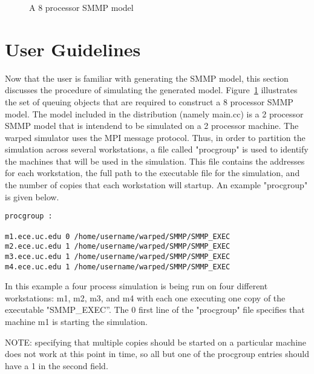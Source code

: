 \documentclass[11pt]{report}
\begin{document}
\begin{figure}
\centerline{}
\caption{A 8 processor SMMP model}\label{fig:smmp}
\end{figure}

\chapter{User Guidelines}
Now that the user is familiar with generating the SMMP model, this section
discusses the procedure of simulating the generated
model. Figure~\ref{fig:smmp} illustrates the set of queuing objects that
are required to construct a 8 processor SMMP model. The model included in
the distribution (namely main.cc) is a 2 processor SMMP model that is
intendend to be simulated on a 2 processor machine. The {\sc warped}
simulator uses the MPI message protocol.  Thus, in order to partition the
simulation across several workstations, a file called "procgroup" is used
to identify the machines that will be used in the simulation.  This file
contains the addresses for each workstation, the full path to the
executable file for the simulation, and the number of copies that each
workstation will startup.  An example "procgroup" is given below.

\begin{verbatim}
procgroup :

m1.ece.uc.edu 0 /home/username/warped/SMMP/SMMP_EXEC
m2.ece.uc.edu 1 /home/username/warped/SMMP/SMMP_EXEC
m3.ece.uc.edu 1 /home/username/warped/SMMP/SMMP_EXEC
m4.ece.uc.edu 1 /home/username/warped/SMMP/SMMP_EXEC
\end{verbatim}

In this example a four process simulation is being run on four different
workstations: m1, m2, m3, and m4 with each one executing one copy of the
executable "SMMP\_EXEC''.  The 0 first line of the "procgroup" file
specifies that machine m1 is starting the simulation.

NOTE: specifying that multiple copies should be started on a particular
machine does not work at this point in time, so all but one of the
procgroup entries should have a 1 in the second field.
\end{document}
